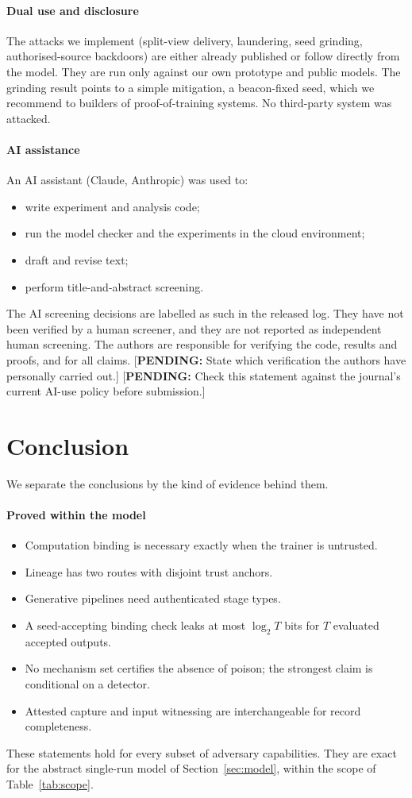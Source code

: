 \documentclass[journal,10pt]{IEEEtran}
\theoremstyle{definition}
\newcommand{\pending}[1]{{\color{red!70!black}[\textbf{PENDING:} #1]}}
\begin{document}
\paragraph{Dual use and disclosure}
The attacks we implement (split-view delivery, laundering, seed grinding, authorised-source
backdoors) are either already published or follow directly from the model. They are run only
against our own prototype and public models. The grinding result points to a simple
mitigation, a beacon-fixed seed, which we recommend to builders of proof-of-training systems.
No third-party system was attacked.

\paragraph{AI assistance}
An AI assistant (Claude, Anthropic) was used to:
\begin{itemize}
\item write experiment and analysis code;
\item run the model checker and the experiments in the cloud environment;
\item draft and revise text;
\item perform title-and-abstract screening.
\end{itemize}
The AI screening decisions are labelled as such in the released log. They have not been
verified by a human screener, and they are not reported as independent human screening. The
authors are responsible for verifying the code, results and proofs, and for all claims.
\pending{State which verification the authors have personally carried out.} \pending{Check this statement against the journal's current AI-use policy before
submission.}

\section{Conclusion}
We separate the conclusions by the kind of evidence behind them.

\paragraph{Proved within the model}
\begin{itemize}
\item Computation binding is necessary exactly when the trainer is untrusted.
\item Lineage has two routes with disjoint trust anchors.
\item Generative pipelines need authenticated stage types.
\item A seed-accepting binding check leaks at most $\log_2T$ bits for $T$ evaluated accepted
  outputs.
\item No mechanism set certifies the absence of poison; the strongest claim is conditional on
  a detector.
\item Attested capture and input witnessing are interchangeable for record completeness.
\end{itemize}
These statements hold for every subset of adversary capabilities. They are exact for the
abstract single-run model of Section~\ref{sec:model}, within the scope of
Table~\ref{tab:scope}.
\end{document}
